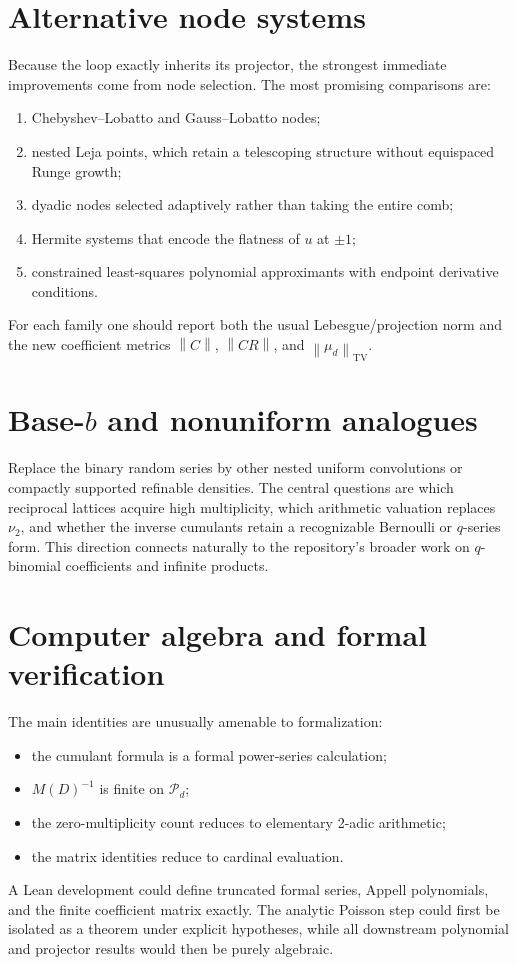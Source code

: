 \documentclass[11pt,oneside]{book}
\theoremstyle{definition}
\theoremstyle{remark}
\newcommand{\Pp}{\mathcal P}
\newcommand{\vtwo}{\nu_2}
\newcommand{\norm}[1]{\left\lVert#1\right\rVert}
\begin{document}
\section{Alternative node systems}
Because the loop exactly inherits its projector, the strongest immediate improvements come from node selection.  The most promising comparisons are:
\begin{enumerate}
\item Chebyshev--Lobatto and Gauss--Lobatto nodes;
\item nested Leja points, which retain a telescoping structure without equispaced Runge growth;
\item dyadic nodes selected adaptively rather than taking the entire comb;
\item Hermite systems that encode the flatness of \(u\) at \(\pm1\);
\item constrained least-squares polynomial approximants with endpoint derivative conditions.
\end{enumerate}
For each family one should report both the usual Lebesgue/projection norm and the new coefficient metrics \(\norm{C}\), \(\norm{CR}\), and \(\norm{\mu_d}_{\mathrm{TV}}\).

\section{Base-\(b\) and nonuniform analogues}
Replace the binary random series by other nested uniform convolutions or compactly supported refinable densities.  The central questions are which reciprocal lattices acquire high multiplicity, which arithmetic valuation replaces \(\vtwo\), and whether the inverse cumulants retain a recognizable Bernoulli or \(q\)-series form.  This direction connects naturally to the repository's broader work on \(q\)-binomial coefficients and infinite products.

\section{Computer algebra and formal verification}
The main identities are unusually amenable to formalization:
\begin{itemize}
\item the cumulant formula is a formal power-series calculation;
\item \(M(D)^{-1}\) is finite on \(\Pp_d\);
\item the zero-multiplicity count reduces to elementary 2-adic arithmetic;
\item the matrix identities reduce to cardinal evaluation.
\end{itemize}
A Lean development could define truncated formal series, Appell polynomials, and the finite coefficient matrix exactly.  The analytic Poisson step could first be isolated as a theorem under explicit hypotheses, while all downstream polynomial and projector results would then be purely algebraic.
\end{document}
